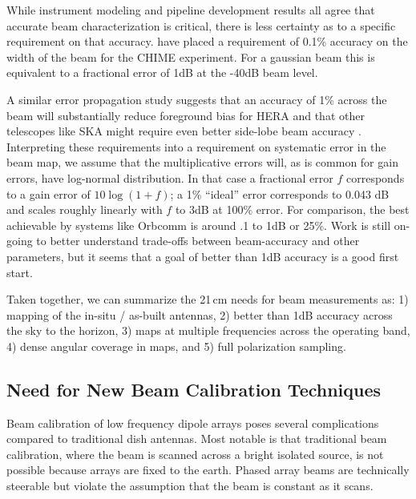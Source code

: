 \documentclass[preprint2,numberedappendix,tighten,twocolappendix]{aastex6}
\begin{document}
While instrument modeling and pipeline development results all agree that accurate beam characterization is critical, there is less certainty as to a specific requirement on that accuracy.  \citet{Shaw2015_chimemmodes} have placed a requirement of 0.1\% accuracy on the width of the beam for the CHIME experiment. For a gaussian beam this is equivalent to a fractional error of 1dB at the -40dB beam level.

A similar error propagation study suggests that an accuracy of 1\% across the beam will substantially reduce foreground bias for HERA and that other telescopes like SKA might require even better side-lobe beam accuracy \citep{2016arXiv161002689E}. Interpreting these requirements into a requirement on systematic error in the beam map, we assume that the multiplicative errors will, as is common for gain errors, have log-normal distribution. In that case a fractional error $f$ corresponds to a gain error of $10 \log (1+f)$; a 1\% ``ideal'' error corresponds to 0.043 dB and scales roughly linearly with $f$ to 3dB at 100\% error. For comparison, the best achievable by systems like Orbcomm is around .1 to 1dB or 25\%. Work is still on-going to better understand trade-offs between beam-accuracy and other parameters, but it seems that a goal of better than 1dB accuracy is a good first start.

Taken together, we can summarize the 21\,cm needs for beam measurements as: 1) mapping of the in-situ / as-built antennas, 2) better than 1dB accuracy across the sky to the horizon, 3) maps at multiple frequencies across the operating band, 4) dense angular coverage in maps, and 5) full polarization sampling.

\subsection{Need for New Beam Calibration Techniques}

Beam calibration of low frequency dipole arrays poses several complications compared to traditional dish antennas. Most notable is that traditional beam calibration, where the beam is scanned across a bright isolated source, is not possible because arrays are fixed to the earth. Phased array beams are technically steerable but violate the assumption that the beam is constant as it scans. 
\end{document}
